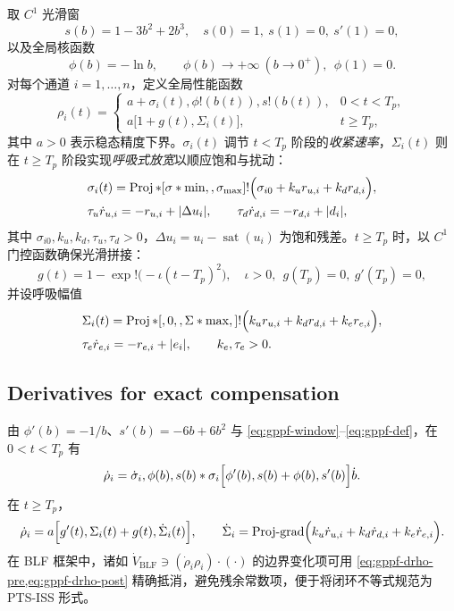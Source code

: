 \documentclass[pdflatex,sn-mathphys-num]{sn-jnl}%
\theoremstyle{thmstyleone}%
\theoremstyle{thmstyletwo}%
\theoremstyle{thmstylethree}%
\begin{document}
取 $C^1$ 光滑窗
\begin{equation}\label{eq\:gppf-window}
s(b)=1-3b^2+2b^3,\quad s(0)=1,\ s(1)=0,\ s'(1)=0,
\end{equation}
以及全局核函数
\begin{equation}\label{eq\:gppf-kernel}
\phi(b)=-\ln b,\qquad \phi(b)\to+\infty\ (b\to0^+),\ \ \phi(1)=0.
\end{equation}
对每个通道 $i=1,\dots,n$，定义全局性能函数
\begin{equation}\label{eq\:gppf-def}
\rho_i(t)=
\begin{cases}
\displaystyle a+\sigma_i(t),\phi!\left(b(t)\right),s!\left(b(t)\right), & 0<t<T_p,\\
\displaystyle a\bigl[1+g(t),\Sigma_i(t)\bigr], & t\ge T_p,
\end{cases}
\end{equation}
其中 $a>0$ 表示稳态精度下界。$\sigma_i(t)$ 调节 $t<T_p$ 阶段的\emph{收紧速率}，$\Sigma_i(t)$ 则在 $t\ge T_p$ 阶段实现\emph{呼吸式放宽}以顺应饱和与扰动：
\begin{align}
&\sigma_i(t)=\operatorname{Proj}*{[\sigma*{\min},,\sigma_{\max}]}!\Bigl(\sigma_{i0}+k_u r_{u,i}+k_d r_{d,i}\Bigr),\label{eq\:gppf-sigma}\\
&\tau_u \dot r_{u,i}=-r_{u,i}+|\Delta u_i|,\qquad
\tau_d \dot r_{d,i}=-r_{d,i}+|d_i|,\nonumber
\end{align}
其中 $\sigma_{i0},k_u,k_d,\tau_u,\tau_d>0$，$\Delta u_i=u_i-\operatorname{sat}(u_i)$ 为饱和残差。$t\ge T_p$ 时，以 $C^1$ 门控函数确保光滑拼接：
\begin{equation}\label{eq\:gppf-gate}
g(t)=1-\exp!\bigl(-\iota (t-T_p)^2\bigr),\quad \iota>0,\ \ g(T_p)=0,\ g'(T_p)=0,
\end{equation}
并设呼吸幅值
\begin{align}
&\Sigma_i(t)=\operatorname{Proj}*{[,0,,\Sigma*{\max},]}!\Bigl(k_u r_{u,i}+k_d r_{d,i}+k_e r_{e,i}\Bigr),\label{eq\:gppf-Sigma}\\
&\tau_e \dot r_{e,i}=-r_{e,i}+|e_i|,\qquad k_e,\tau_e>0.\nonumber
\end{align}

\subsection{Derivatives for exact compensation}

由 $\phi'(b)=-1/b$、$s'(b)=-6b+6b^2$ 与 \cref{eq:gppf-window}–\cref{eq:gppf-def}，在 $0<t<T_p$ 有
\begin{equation}\label{eq\:gppf-drho-pre}
\dot\rho_i
= \dot\sigma_i,\phi(b),s(b)
* \sigma_i\Bigl[\phi'(b),s(b)+\phi(b),s'(b)\Bigr]\dot b .
  \end{equation}
  在 $t\ge T_p$，
  \begin{equation}\label{eq:gppf-drho-post}
  \dot\rho_i
  = a\Bigl[g'(t),\Sigma_i(t)+g(t),\dot\Sigma_i(t)\Bigr],\qquad
  \dot\Sigma_i=\text{Proj-grad}\Bigl(k_u\dot r_{u,i}+k_d\dot r_{d,i}+k_e\dot r_{e,i}\Bigr).
  \end{equation}
  在 BLF 框架中，诸如 $\dot V_{\mathrm{BLF}}\ni (\dot\rho_i \rho_i)\cdot(\cdot)$ 的边界变化项可用 \cref{eq:gppf-drho-pre,eq:gppf-drho-post} 精确抵消，避免残余常数项，便于将闭环不等式规范为 PTS-ISS 形式。
\end{document}
